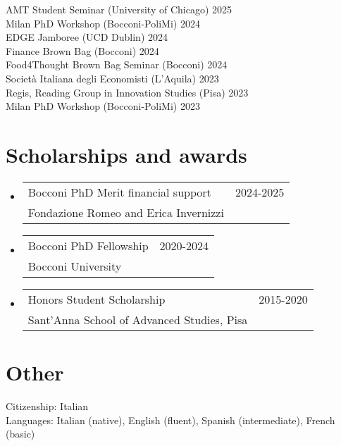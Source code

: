 \documentclass[A4,11pt]{article}
\makeatletter
\newcommand{\CVAw}[4]{
	\vspace{-2pt}\item
	\begin{tabular*}{0.97\textwidth}[t]{l@{\extracolsep{\fill}}r}
		#1 & #2 \\
		\small#3 & \small #4 \\
	\end{tabular*}\vspace{-7pt}
}
\newcommand{\CVSubHeadingListStart}{\begin{itemize}[leftmargin=0.5cm, label={}]}
\newcommand{\CVSubHeadingListEnd}{\end{itemize}}
\makeatother
\begin{document}
\smallskip
\hspace{12pt} AMT Student Seminar (University of Chicago) \hfill 2025\\
\smallskip
\hspace{12pt} Milan PhD Workshop (Bocconi-PoliMi) \hfill 2024\\
\smallskip
\hspace{12pt} EDGE Jamboree (UCD Dublin) \hfill 2024\\
\smallskip
\hspace{12pt} Finance Brown Bag (Bocconi) \hfill 2024\\
\smallskip
\hspace{12pt} Food4Thought Brown Bag Seminar (Bocconi) \hfill 2024\\
\smallskip
\hspace{12pt} Società Italiana degli Economisti (L'Aquila) \hfill 2023\\
\smallskip
\hspace{12pt} Regis, Reading Group in Innovation Studies (Pisa) \hfill 2023\\
\smallskip
\hspace{12pt} Milan PhD Workshop (Bocconi-PoliMi) \hfill 2023\\

\vspace{1pt}

\section{Scholarships and awards}

\CVSubHeadingListStart
\CVAw{Bocconi PhD Merit financial support}{2024-2025}{Fondazione Romeo and Erica Invernizzi}{}
\CVAw{Bocconi PhD Fellowship}{2020-2024}{Bocconi University}{}
\CVAw{Honors Student Scholarship}{2015-2020}{Sant’Anna School of Advanced Studies, Pisa}{}

\CVSubHeadingListEnd


\vspace{1pt}

\section{Other}
\hspace{12pt} Citizenship: Italian\\
\smallskip
\hspace{12pt} Languages: Italian (native), English (fluent), Spanish (intermediate), French (basic)
    
\end{document}
